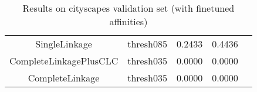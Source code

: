 \begin{table*}
\begin{subtable}[t!]{0.98\textwidth}
\begin{tabular}{c| c| c | c | c}
SingleLinkage & thresh085 & {\color{Red} 0.2433 } & {\color{Red} 0.4436 } \\
CompleteLinkagePlusCLC & thresh035  & {\color{Red} 0.0000 } & {\color{Red} 0.0000 } \\
CompleteLinkage & thresh035  & {\color{Red} 0.0000 } & {\color{Red} 0.0000 } \\


        \end{tabular}
    \end{subtable} 
    \caption{Results on cityscapes validation set (with finetuned affinities)}
    \label{tab:linkage-criteria}
\end{table*}


